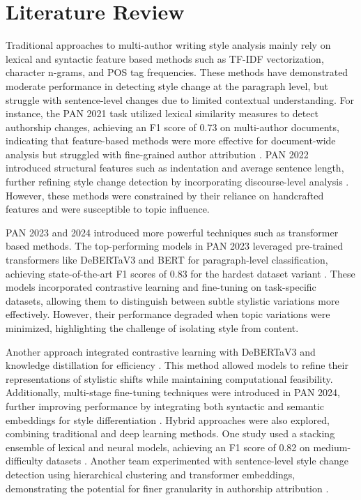 \section{Literature Review}

Traditional approaches to multi-author writing style analysis mainly rely on lexical and syntactic feature based methods such as TF-IDF vectorization, character n-grams, and POS tag frequencies. These methods have demonstrated moderate performance in detecting style change at the paragraph level, but struggle with sentence-level changes due to limited contextual understanding. For instance, the PAN 2021 task utilized lexical similarity measures to detect authorship changes, achieving an F1 score of 0.73 on multi-author documents, indicating that feature-based methods were more effective for document-wide analysis but struggled with fine-grained author attribution \cite{paper6}. PAN 2022 introduced structural features such as indentation and average sentence length, further refining style change detection by incorporating discourse-level analysis \cite{paper4}. However, these methods were constrained by their reliance on handcrafted features and were susceptible to topic influence.

PAN 2023 and 2024 introduced more powerful techniques such as transformer based methods. The top-performing models in PAN 2023 leveraged pre-trained transformers like DeBERTaV3 and BERT for paragraph-level classification, achieving state-of-the-art F1 scores of 0.83 for the hardest dataset variant \cite{paper3}. These models incorporated contrastive learning and fine-tuning on task-specific datasets, allowing them to distinguish between subtle stylistic variations more effectively. However, their performance degraded when topic variations were minimized, highlighting the challenge of isolating style from content.

Another approach integrated contrastive learning with DeBERTaV3 and knowledge distillation for efficiency \cite{paper3}. This method allowed models to refine their representations of stylistic shifts while maintaining computational feasibility. Additionally, multi-stage fine-tuning techniques were introduced in PAN 2024, further improving performance by integrating both syntactic and semantic embeddings for style differentiation \cite{paper2}. Hybrid approaches were also explored, combining traditional and deep learning methods. One study used a stacking ensemble of lexical and neural models, achieving an F1 score of 0.82 on medium-difficulty datasets \cite{paper3}. Another team experimented with sentence-level style change detection using hierarchical clustering and transformer embeddings, demonstrating the potential for finer granularity in authorship attribution \cite{paper2}.

